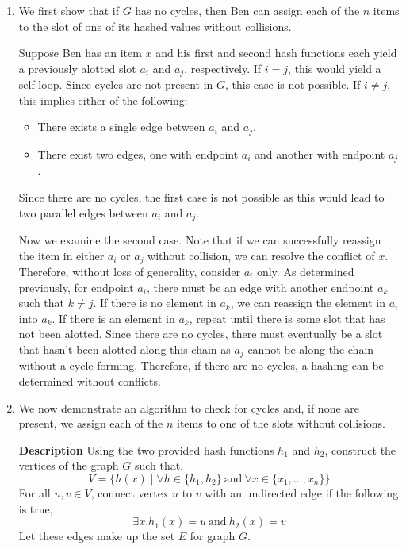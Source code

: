 \documentclass[12pt,twoside]{article}
\begin{document}
\begin{problems}

\problem  %

\begin{problemparts}

\problempart %

\begin{enumerate}[label=\textbf{(\roman*)}]

  \item We first show that if $G$ has no cycles, then Ben can assign each of
  the $n$ items to the slot of one of its hashed values without collisions.

  Suppose Ben has an item $x$ and his first and second hash functions each
  yield a previously alotted slot $a_i$ and $a_j$, respectively. If $i = j$,
  this would yield a self-loop. Since cycles are not present in $G$, this
  case is not possible. If $i \neq j$, this implies either of the following:
  \begin{itemize}
    \item There exists a single edge between $a_i$ and $a_j$.
    \item There exist two edges, one with endpoint $a_i$ and another with
    endpoint $a_j$.
  \end{itemize}
  Since there are no cycles, the first case is not possible as this would
  lead to two parallel edges between $a_i$ and $a_j$.

  Now we examine the second case. Note that if we can successfully reassign
  the item in either $a_i$ or $a_j$ without collision, we can resolve the
  conflict of $x$. Therefore, without loss of generality, consider $a_i$
  only. As determined previously, for endpoint $a_i$, there must be an edge
  with another endpoint $a_k$ such that $k \neq j$. If there is no element in
  $a_k$, we can reassign the element in $a_i$ into $a_k$. If there is an
  element in $a_k$, repeat until there is some slot that has not been
  alotted. Since there are no cycles, there must eventually be a slot that
  hasn't been alotted along this chain as $a_j$ cannot be along the chain
  without a cycle forming. Therefore, if there are no cycles, a hashing can
  be determined without conflicts.

  \item We now demonstrate an algorithm to check for cycles and, if none are
  present, we assign each of the $n$ items to one of the slots without
  collisions.

  {\bf Description} Using the two provided hash functions $h_1$ and $h_2$,
  construct the vertices of the graph $G$ such that,
  $$V = \{ h(x) \mid \forall h \in \{h_1, h_2\}\ \mathrm{and}\ \forall x \in
  \{x_1, \ldots, x_n\}\}$$
  For all $u, v \in V$, connect vertex $u$ to $v$ with an undirected edge if
  the following is true,
  $$ \exists x . h_1(x) = u\ \mathrm{and}\ h_2(x) = v $$
  Let these edges make up the set $E$ for graph $G$.
  

\end{enumerate}
\end{problemparts}
\end{problems}
\end{document}
